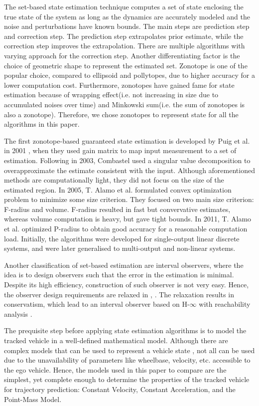 The set-based state estimation technique computes a set of state enclosing the true state of the system as long as the dynamics are accurately modeled and the noise and perturbations have known bounds. The main steps are prediction step and correction step. The prediction step extrapolates prior estimate, while the correction step improves the extrapolation. There are multiple algorithms with varying approach for the correction step. Another differentiating factor is the choice of geometric shape to represent the estimated set. Zonotope is one of the popular choice, compared to ellipsoid and pollytopes, due to higher accuracy for a lower computation cost. Furthermore, zonotopes have gained fame for state estimation because of wrapping effect(i.e. not increasing in size due to accumulated noises over time) and Minkowski sum(i.e. the sum of zonotopes is also a zonotope). Therefore, we chose zonotopes to represent state for all the algorithms in this paper.

The first zonotope-based guaranteed state estimation is developed by Puig et al. in 2001 \cite{Puig2001}, when they used gain matrix to map input measurement to a set of estimation. Following in 2003, Combastel \cite{Combastel2003} used a singular value decomposition to overapproximate the estimate consistent with the input. Although aforementioned methods are computationally light, they did not focus on the size of the estimated region. In 2005, T. Alamo et al. \cite{Alamo2005} formulated convex optimization problem to minimize some size criterion. They focused on two main size criterion: F-radius and volume. F-radius resulted in fast but convervative estimates, whereas volume computation is heavy, but gave tight bounds. In 2011, T. Alamo et al. \cite{Le2012} optimized P-radius to obtain good accuracy for a reasonable computation load. Initially, the algorithms were developed for single-output linear discrete systems, and were later generalised to multi-output and non-linear systems.  

Another classification of set-based estimation are interval observers, where the idea is to design observers such that the error in the estimation is minimal. Despite its high efficiency, construction of such observer is not very easy. Hence, the observer design requirements are relaxed in  \cite{Mazenc2011}, \cite{Raissi2012}. The relaxation results in conservatism, which lead to an interval observer based on H-$\infty$ with reachability analysis \cite{Tang2019}.

The prequisite step before applying state estimation algorithms is to model the tracked vehicle in a well-defined mathematical model. Although there are complex models that can be used to represent a vehicle state \cite{Althoff}, not all can be used due to the unavailability of parameters like wheelbase, velocity, etc. accessible to the ego vehicle. Hence, the models used in this paper to compare are the simplest, yet complete enough to determine the properties of the tracked vehicle for trajectory prediction: Constant Velocity, Constant Acceleration, and the Point-Mass Model.

